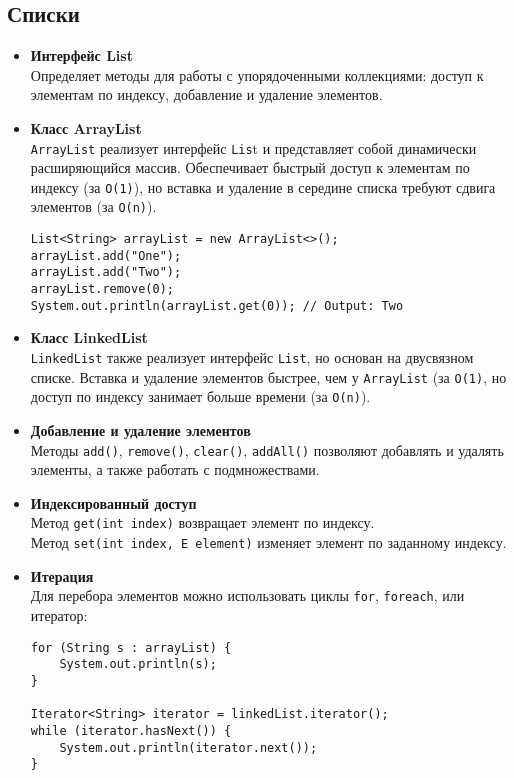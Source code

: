\subsection{Списки}
\begin{itemize}
    \item \textbf{Интерфейс List} \\
    Определяет методы для работы с упорядоченными коллекциями: доступ к элементам по индексу, добавление и удаление элементов.
    
    \item \textbf{Класс ArrayList} \\
    \texttt{ArrayList} реализует интерфейс \texttt{Lis}t и представляет собой динамически расширяющийся массив. Обеспечивает быстрый доступ к элементам по индексу (за \texttt{O(1)}), но вставка и удаление в середине списка требуют сдвига элементов (за \texttt{O(n)}).

    \begin{verbatim}
List<String> arrayList = new ArrayList<>();
arrayList.add("One");
arrayList.add("Two");
arrayList.remove(0);
System.out.println(arrayList.get(0)); // Output: Two
    \end{verbatim}
    
    \item \textbf{Класс LinkedList} \\
    \texttt{LinkedList} также реализует интерфейс \texttt{List}, но основан на двусвязном списке. Вставка и удаление элементов быстрее, чем у \texttt{ArrayList} (за \texttt{O(1)}, но доступ по индексу занимает больше времени (за \texttt{O(n)}).
    
    \item \textbf{Добавление и удаление элементов} \\
    Методы \texttt{add()}, \texttt{remove()}, \texttt{clear()}, \texttt{addAll()} позволяют добавлять и удалять элементы, а также работать с подмножествами.
    
    \item \textbf{Индексированный доступ} \\
    Метод \texttt{get(int index)} возвращает элемент по индексу. \\ Метод \texttt{set(int index, E element)} изменяет элемент по заданному индексу.
    
    \item \textbf{Итерация} \\
    Для перебора элементов можно использовать циклы \texttt{for}, \texttt{foreach}, или итератор:
    \begin{verbatim}
for (String s : arrayList) {
    System.out.println(s);
}

Iterator<String> iterator = linkedList.iterator();
while (iterator.hasNext()) {
    System.out.println(iterator.next());
}
    \end{verbatim}
\end{itemize}


